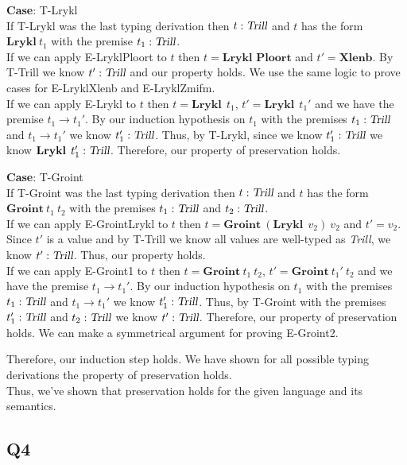 \documentclass[12pt, fleqn]{article}
\begin{document}
\begin{enumerate}[(a)]
    \textbf{Case}: T-Lrykl\\
    If T-Lrykl was the last typing derivation then $t : \textsl{Trill}$ and $t$ has the form $\textbf{Lrykl}\:t_1$ with the premise $t_1 : \textsl{Trill}$.\\
    If we can apply E-LryklPloort to $t$ then $t = \textbf{Lrykl Ploort}$ and $t' = \textbf{Xlenb}$. By T-Trill we know $t' : \textsl{Trill}$ and our property holds. We use the same logic to prove cases for E-LryklXlenb and E-LryklZmifm.\\
    If we can apply E-Lrykl to $t$ then $t = \textbf{Lrykl}\:\:t_1$, $t' = \textbf{Lrykl}\:\:t_1'$ and we have the premise $t_1 \rightarrow t_1'$. By our induction hypothesis on $t_1$ with the premises $t_1 : \textsl{Trill}$ and $t_1 \rightarrow t_1'$ we know $t_1' : \textsl{Trill}$. Thus, by T-Lrykl, since we know $t_1' : \textsl{Trill}$ we know $\textbf{Lrykl}\:\:t_1' : \textsl{Trill}$. Therefore, our property of preservation holds.

    \textbf{Case}: T-Groint\\
    If T-Groint was the last typing derivation then $t : \textsl{Trill}$ and $t$ has the form $\textbf{Groint}\:t_1\:t_2$ with the premises $t_1 : \textsl{Trill}$ and $t_2 : \textsl{Trill}$.\\
    If we can apply E-GrointLrykl to $t$ then $t = \textbf{Groint}\:(\textbf{Lrykl}\:\:v_2)\:v_2$ and $t' = v_2$. Since $t'$ is a value and by T-Trill we know all values are well-typed as \textsl{Trill}, we know $t' : \textsl{Trill}$. Thus, our property holds.\\
    If we can apply E-Groint1 to $t$ then $t = \textbf{Groint}\:t_1\:t_2$, $t' = \textbf{Groint}\:t_1'\:t_2$ and we have the premise $t_1 \rightarrow t_1'$. By our induction hypothesis on $t_1$ with the premises $t_1 : \textsl{Trill}$ and $t_1 \rightarrow t_1'$ we know $t_1': \textsl{Trill}$. Thus, by T-Groint with the premises $t_1': \textsl{Trill}$ and $t_2 : \textsl{Trill}$ we know $t' : \textsl{Trill}$. Therefore, our property of preservation holds. We can make a symmetrical argument for proving E-Groint2.

    Therefore, our induction step holds. We have shown for all possible typing derivations the property of preservation holds.\\
    Thus, we've shown that preservation holds for the given language and its semantics. 

\end{enumerate}

\subsection{Q4}
\end{document}
